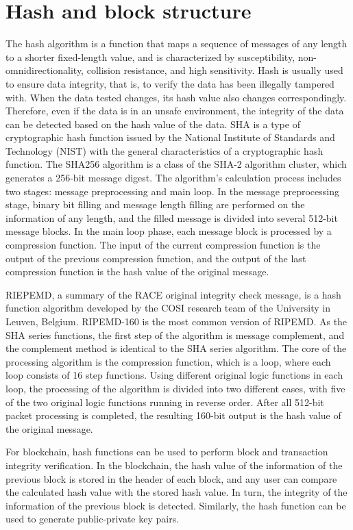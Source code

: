 \documentclass[BTech]{srmuthesis}
\begin{document}
 \section{Hash and block structure}
 The hash algorithm is a function that maps a sequence of messages of any length to a shorter fixed-length value, and is characterized by susceptibility, non-omnidirectionality, collision resistance, and high sensitivity. Hash is usually used to ensure data integrity, that is, to verify the data has been illegally tampered with. When the data tested changes, its hash value also changes correspondingly. Therefore, even if the data is in an unsafe environment, the integrity of the data can be detected based on the hash value of the data.
 SHA is a type of cryptographic hash function issued by the National Institute of Standards and Technology (NIST) with the general characteristics of a cryptographic hash function. The SHA256 algorithm is a class of the SHA-2 algorithm cluster, which generates a 256-bit message digest. The algorithm's calculation process includes two stages: message preprocessing and main loop. In the message preprocessing stage, binary bit filling and message length filling are performed on the information of any length, and the filled message is divided into several 512-bit message blocks. In the main loop phase, each message block is processed by a compression function. The input of the current compression function is the output of the previous compression function, and the output of the last compression function is the hash value of the original message.

 RIEPEMD, a summary of the RACE original integrity check message, is a hash function algorithm developed by the COSI research team of the University in Leuven, Belgium. RIPEMD-160 is the most common version of RIPEMD. As the SHA series functions, the first step of the algorithm is message complement, and the complement method is identical to the SHA series algorithm. The core of the processing algorithm is the compression function, which is a loop, where each loop consists of 16 step functions. Using different original logic functions in each loop, the processing of the algorithm is divided into two different cases, with five of the two original logic functions running in reverse order. After all 512-bit packet processing is completed, the resulting 160-bit output is the hash value of the original message.

 For blockchain, hash functions can be used to perform block and transaction integrity verification. In the blockchain, the hash value of the information of the previous block is stored in the header of each block, and any user can compare the calculated hash value with the stored hash value. In turn, the integrity of the information of the previous block is detected. Similarly, the hash function can be used to generate public-private key pairs.
\end{document}
